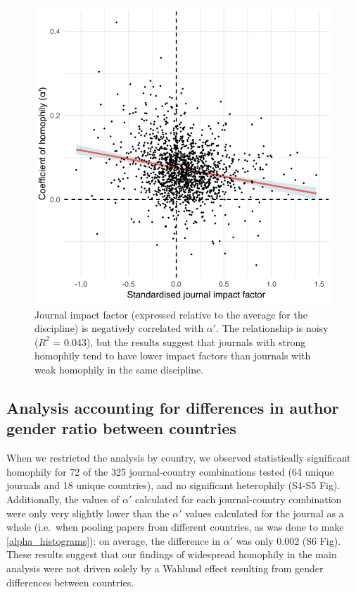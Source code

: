 \documentclass[12pt,]{article}
\begin{document}
\begin{figure}
\centering
\includegraphics{../figures/Fig5.pdf}
\caption{Journal impact factor (expressed relative to the average for
the discipline) is negatively correlated with \(\alpha'\). The
relationship is noisy (\(R^2\) = 0.043), but the results suggest that
journals with strong homophily tend to have lower impact factors than
journals with weak homophily in the same discipline.
\label{impact_factor}}
\end{figure}

\subsection{Analysis accounting for differences in author gender ratio
between
countries}\label{analysis-accounting-for-differences-in-author-gender-ratio-between-countries}

When we restricted the analysis by country, we observed statistically
significant homophily for 72 of the 325 journal-country combinations
tested (64 unique journals and 18 unique countries), and no significant
heterophily (S4-S5 Fig). Additionally, the values of \(\alpha'\)
calculated for each journal-country combination were only very slightly
lower than the \(\alpha'\) values calculated for the journal as a whole
(i.e.~when pooling papers from different countries, as was done to make
\autoref{alpha_histograms}): on average, the difference in \(\alpha'\)
was only 0.002 (S6 Fig). These results suggest that our findings of
widespread homophily in the main analysis were not driven solely by a
Wahlund effect resulting from gender differences between countries.
\end{document}
